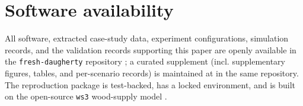 \section{Software availability}

All software, extracted case-study data, experiment configurations, simulation records, and the validation records supporting this paper are openly available in the \texttt{fresh-daugherty} repository \citep{freshdaugherty}; a curated supplement (incl. supplementary figures, tables, and per-scenario records) is maintained at  in the same repository. The reproduction package is test-backed, has a locked environment, and is built on the open-source \texttt{ws3} wood-supply model \citep{paradis2026ws3}.
